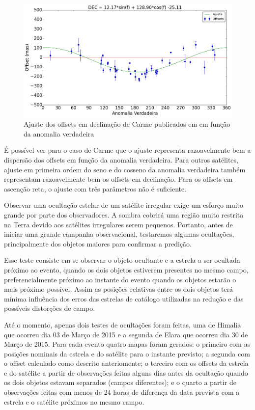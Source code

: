 \documentclass[12pt,a4paper]{monografia}
\begin{document}
\begin{figure}
\begin{centering}
\includegraphics[scale=0.45]{figuras/Carme-DEC_fit.png} 
\caption{Ajuste dos offsets em declinação de Carme publicados em \cite{GomesJunior2015-Irregular} em função da anomalia verdadeira}
\label{Fig: Carme-dec-fit}
\end{centering}
\end{figure}

É possível ver para o caso de Carme que o ajuste representa razoavelmente bem a dispersão dos offsets em função da anomalia verdadeira. Para outros satélites, ajuste em primeira ordem do seno e do cosseno da anomalia verdadeira também representam razoavelmente bem os offsets em declinação. Para os offsets em ascenção reta, o ajuste com três parâmetros não é suficiente.

Observar uma ocultação estelar de um satélite irregular exige um esforço muito grande por parte dos observadores. A sombra cobrirá uma região muito restrita na Terra devido aos satélites irregulares serem pequenos. Portanto, antes de iniciar uma grande campanha observacional, testaremos algumas ocultações, principalmente dos objetos maiores para confirmar a predição.

Esse teste consiste em se observar o objeto ocultante e a estrela a ser ocultada próximo ao evento, quando os dois objetos estiverem presentes no mesmo campo, preferencialmente próximo ao instante do evento quando os objetos estarão o mais próximo possível. Assim as posições relativas entre os dois objetos terá mínima influência dos erros das estrelas de catálogo utilizadas na redução e das possíveis distorções de campo.

Até o momento, apenas dois testes de ocultações foram feitas, uma de Himalia que ocorreu dia 03 de Março de 2015 e a segunda de Elara que ocorreu dia 30 de Março de 2015. Para cada evento quatro mapas foram gerados: o primeiro com as posições nominais da estrela e do satélite para o instante previsto; a segunda com o offset calculado como descrito anteriomente; o terceiro com os offsets da estrela e do satélite a partir de observações feitas alguns dias antes da ocultação quando os dois objetos estavam separados (campos diferentes); e o quarto a partir de observações feitas com menos de 24 horas de diferença da data prevista com a estrela e o satélite próximos no mesmo campo.
\end{document}
